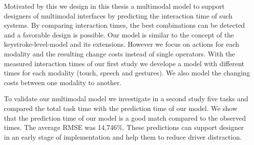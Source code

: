 Motivated by this we design in this thesis a multimodal model to support designers of multimodal interfaces by predicting the interaction time of such systems.
By comparing interaction times, the best combinations can be detected and a favorable design is possible.
Our model is similar to the concept of the keystroke-level-model and its extensions.
However we focus on actions for each modality and the resulting change costs instead of single operators.
With the measured interaction times of our first study we develope a model with different times for each modality (touch, speech and gestures).
We also model the changing costs between one modality to another.

To validate our multimodal model we investigate in a second study five tasks and compared the total task time with the prediction time of our model.
We show that the prediction time of our model is a good match compared to the observed times.
The average RMSE was 14,746\%.
These predictions can support designer in an early stage of implementation and help them to reduce driver distraction.